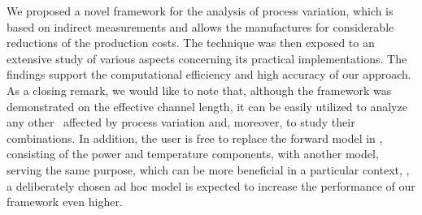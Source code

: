 We proposed a novel framework for the analysis of process variation, which is based on indirect measurements and allows the manufactures for considerable reductions of the production costs. The technique was then exposed to an extensive study of various aspects concerning its practical implementations. The findings support the computational efficiency and high accuracy of our approach.
As a closing remark, we would like to note that, although the framework was demonstrated on the effective channel length, it can be easily utilized to analyze any other \qois\ affected by process variation and, moreover, to study their combinations. In addition, the user is free to replace the forward model in , consisting of the power and temperature components, with another model, serving the same purpose, which can be more beneficial in a particular context, \eg, a deliberately chosen ad hoc model is expected to increase the performance of our framework even higher.

